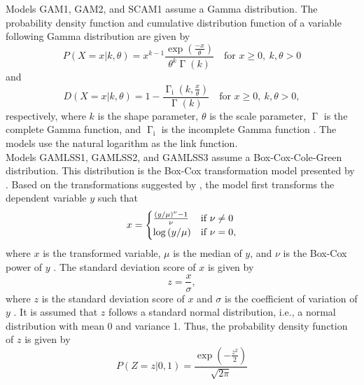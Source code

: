 Models GAM1, GAM2, and SCAM1 assume a Gamma distribution.  The probability density function and cumulative distribution function of a variable following Gamma distribution are given by
\begin{equation}
  \label{eq:GammaDistributionPDF}
  P(X = x|k, \theta) = x^{k - 1} \frac{\exp{\left(\frac{-x}{\theta}\right)}}{\theta^k \upGamma(k)} \quad \text{for } x \geq 0, ~ k, \theta > 0
\end{equation}
and
\begin{equation}
  \label{eq:GammaDistributionCDF}
    D(X = x|k, \theta) = 1 - \frac{\upGamma_{\text{i}}\left(k, \frac{x}{\theta}\right)}{\upGamma(k)} \quad \text{for } x \geq 0, ~ k, \theta > 0,
\end{equation}
respectively, where \(k\) is the shape parameter, \(\theta\) is the scale parameter, \(\upGamma\) is the complete Gamma function, and \(\upGamma_{\text{i}}\) is the incomplete Gamma function \parencite{Weisstein2017b,Dormann2013,Lindgren1976}.  The models use the natural logarithm as the link function.  \\
Models GAMLSS1, GAMLSS2, and GAMLSS3 assume a Box-Cox-Cole-Green distribution. This distribution is the Box-Cox transformation model presented by \textcite{Cole1992} \parencite{Stasinopoulos2007}.  Based on the transformations suggested by \textcite{Box1964}, the model first transforms the dependent variable \(y\) such that
\begin{equation}
  \label{eq:BoxCoxColeGreenTransformation}
  x =
  \begin{cases}
    \frac{\left(
        y \middle/ \mu
      \right)^\nu - 1}{\nu} &\text{if } \nu \not = 0 \\
    \log\left(y \middle/ \mu\right) &\text{if } \nu = 0,
  \end{cases}
\end{equation}
where \(x\) is the transformed variable, \(\mu\) is the median of \(y\), and \(\nu\) is the Box-Cox power of \(y\) \parencite{Cole1992}.
The standard deviation score of \(x\) is given by
\begin{equation}
  \label{eq:BoxCoxColeGreenSDScore}
  z = \frac{x}{\sigma},
\end{equation}
where \(z\) is the standard deviation score of \(x\) and \(\sigma\) is the coefficient of variation of \(y\) .  It is assumed that \(z\) follows a standard normal distribution, i.e., a normal distribution with mean 0 and variance 1. Thus, the probability density function of \(z\) is given by
\begin{equation}
  \label{eq:StandardNormalDistributionPDF}
  P(Z = z|0, 1) =
  \frac{\exp{\left(-\frac{z^2}{2}\right)}}{\sqrt{2 \pi}}
\end{equation}
